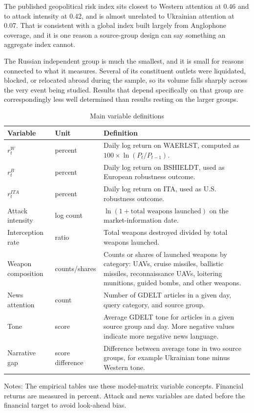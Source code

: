 \documentclass[12pt,a4paper]{article}
\begin{document}
The published geopolitical risk index sits closest to Western attention at 0.46 and to attack intensity at 0.42, and is almost unrelated to Ukrainian attention at 0.07. That is consistent with a global index built largely from Anglophone coverage, and it is one reason a source-group design can say something an aggregate index cannot.

The Russian independent group is much the smallest, and it is small for reasons connected to what it measures. Several of its constituent outlets were liquidated, blocked, or relocated abroad during the sample, so its volume falls sharply across the very event being studied. Results that depend specifically on that group are correspondingly less well determined than results resting on the larger groups.

\begin{table}[H]
\centering
\caption{Main variable definitions}
\label{tab:variables}
\begin{threeparttable}
\begin{tabular}{p{3.5cm} p{2.8cm} p{7.3cm}}
\toprule
Variable & Unit & Definition \\
\midrule
$r^{W}_{t}$ & percent & Daily log return on WAERLST, computed as $100 \times \ln(P_t/P_{t-1})$. \\
$r^{B}_{t}$ & percent & Daily log return on BSHIELDT, used as European robustness outcome. \\
$r^{ITA}_{t}$ & percent & Daily log return on ITA, used as U.S. robustness outcome. \\
Attack intensity & log count & $\ln(1+\text{total weapons launched})$ on the market-information date. \\
Interception rate & ratio & Total weapons destroyed divided by total weapons launched. \\
Weapon composition & counts/shares & Counts or shares of launched weapons by category: UAVs, cruise missiles, ballistic missiles, reconnaissance UAVs, loitering munitions, guided bombs, and other weapons. \\
News attention & count & Number of GDELT articles in a given day, query category, and source group. \\
Tone & score & Average GDELT tone for articles in a given source group and day. More negative values indicate more negative news language. \\
Narrative gap & score difference & Difference between average tone in two source groups, for example Ukrainian tone minus Western tone. \\
\bottomrule
\end{tabular}
\begin{tablenotes}
\small
\item Notes: The empirical tables use these model-matrix variable concepts. Financial returns are measured in percent. Attack and news variables are dated before the financial target to avoid look-ahead bias.
\end{tablenotes}
\end{threeparttable}
\end{table}
\end{document}
